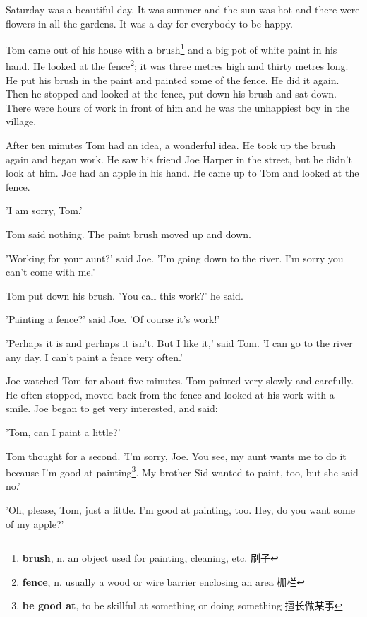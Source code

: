 \documentclass[fontset=ubuntu, zihao=5]{ctexart}
\begin{document}
\begin{paracol}{2}
\switchcolumn*

\sectionbreak


Saturday was a beautiful day. It was summer and the sun was hot and there were flowers in all the gardens. It was a day for everybody to be happy.



Tom came out of his house with a brush\footnote{\textbf{brush}, n. an object used for painting, cleaning, etc. 刷子} and a big pot of white paint in his hand. He looked at the fence\footnote{\textbf{fence}, n. usually a wood or wire barrier enclosing an area 栅栏}; it was three metres high and thirty metres long. He put his brush in the paint and painted some of the fence. He did it again. Then he stopped and looked at the fence, put down his brush and sat down. There were hours of work in front of him and he was the unhappiest boy in the village.

After ten minutes Tom had an idea, a wonderful idea. He took up the brush again and began work. He saw his friend Joe Harper in the street, but he didn't look at him. Joe had an apple in his hand. He came up to Tom and looked at the fence.

'I am sorry, Tom.'

Tom said nothing. The paint brush moved up and down.

'Working for your aunt?' said Joe. 'I'm going down to the river. I'm sorry you can't come with me.'

Tom put down his brush. 'You call this work?' he said.

'Painting a fence?' said Joe. 'Of course it's work!'

'Perhaps it is and perhaps it isn't. But I like it,' said Tom. 'I can go to the river any day. I can't paint a fence very often.'

Joe watched Tom for about five minutes. Tom painted very slowly and carefully. He often stopped, moved back from the fence and looked at his work with a smile. Joe began to get very interested, and said:



'Tom, can I paint a little?'

Tom thought for a second. 'I'm sorry, Joe. You see, my aunt wants me to do
it because I'm good at painting\footnote{\textbf{be good at}, to be skillful at
  something or doing something 擅长做某事}. My brother Sid wanted to paint,
too, but she said no.'

'Oh, please, Tom, just a little. I'm good at painting, too. Hey, do you want some of my apple?'


\end{paracol}
\end{document}
